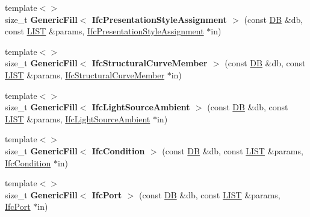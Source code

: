 \begin{DoxyCompactItemize}
\item 
\hypertarget{namespace_assimp_1_1_s_t_e_p_a8219850824ba992e91b2056eb3abce71}{{\footnotesize template$<$$>$ }\\size\+\_\+t {\bfseries Generic\+Fill$<$ Ifc\+Presentation\+Style\+Assignment $>$} (const \hyperlink{class_assimp_1_1_s_t_e_p_1_1_d_b}{D\+B} \&db, const \hyperlink{class_assimp_1_1_s_t_e_p_1_1_e_x_p_r_e_s_s_1_1_l_i_s_t}{L\+I\+S\+T} \&params, \hyperlink{struct_assimp_1_1_i_f_c_1_1_ifc_presentation_style_assignment}{Ifc\+Presentation\+Style\+Assignment} $\ast$in)}\label{namespace_assimp_1_1_s_t_e_p_a8219850824ba992e91b2056eb3abce71}

\item 
\hypertarget{namespace_assimp_1_1_s_t_e_p_a21f3545bc256edff759bf15f77791e60}{{\footnotesize template$<$$>$ }\\size\+\_\+t {\bfseries Generic\+Fill$<$ Ifc\+Structural\+Curve\+Member $>$} (const \hyperlink{class_assimp_1_1_s_t_e_p_1_1_d_b}{D\+B} \&db, const \hyperlink{class_assimp_1_1_s_t_e_p_1_1_e_x_p_r_e_s_s_1_1_l_i_s_t}{L\+I\+S\+T} \&params, \hyperlink{struct_assimp_1_1_i_f_c_1_1_ifc_structural_curve_member}{Ifc\+Structural\+Curve\+Member} $\ast$in)}\label{namespace_assimp_1_1_s_t_e_p_a21f3545bc256edff759bf15f77791e60}

\item 
\hypertarget{namespace_assimp_1_1_s_t_e_p_ae83ce6b19ce949f5f26679525c09c26e}{{\footnotesize template$<$$>$ }\\size\+\_\+t {\bfseries Generic\+Fill$<$ Ifc\+Light\+Source\+Ambient $>$} (const \hyperlink{class_assimp_1_1_s_t_e_p_1_1_d_b}{D\+B} \&db, const \hyperlink{class_assimp_1_1_s_t_e_p_1_1_e_x_p_r_e_s_s_1_1_l_i_s_t}{L\+I\+S\+T} \&params, \hyperlink{struct_assimp_1_1_i_f_c_1_1_ifc_light_source_ambient}{Ifc\+Light\+Source\+Ambient} $\ast$in)}\label{namespace_assimp_1_1_s_t_e_p_ae83ce6b19ce949f5f26679525c09c26e}

\item 
\hypertarget{namespace_assimp_1_1_s_t_e_p_a445924770b49e330ec7119a851d33627}{{\footnotesize template$<$$>$ }\\size\+\_\+t {\bfseries Generic\+Fill$<$ Ifc\+Condition $>$} (const \hyperlink{class_assimp_1_1_s_t_e_p_1_1_d_b}{D\+B} \&db, const \hyperlink{class_assimp_1_1_s_t_e_p_1_1_e_x_p_r_e_s_s_1_1_l_i_s_t}{L\+I\+S\+T} \&params, \hyperlink{struct_assimp_1_1_i_f_c_1_1_ifc_condition}{Ifc\+Condition} $\ast$in)}\label{namespace_assimp_1_1_s_t_e_p_a445924770b49e330ec7119a851d33627}

\item 
\hypertarget{namespace_assimp_1_1_s_t_e_p_aa077c4480d3dfc8252968a0a61310e53}{{\footnotesize template$<$$>$ }\\size\+\_\+t {\bfseries Generic\+Fill$<$ Ifc\+Port $>$} (const \hyperlink{class_assimp_1_1_s_t_e_p_1_1_d_b}{D\+B} \&db, const \hyperlink{class_assimp_1_1_s_t_e_p_1_1_e_x_p_r_e_s_s_1_1_l_i_s_t}{L\+I\+S\+T} \&params, \hyperlink{struct_assimp_1_1_i_f_c_1_1_ifc_port}{Ifc\+Port} $\ast$in)}\label{namespace_assimp_1_1_s_t_e_p_aa077c4480d3dfc8252968a0a61310e53}


\end{DoxyCompactItemize}
